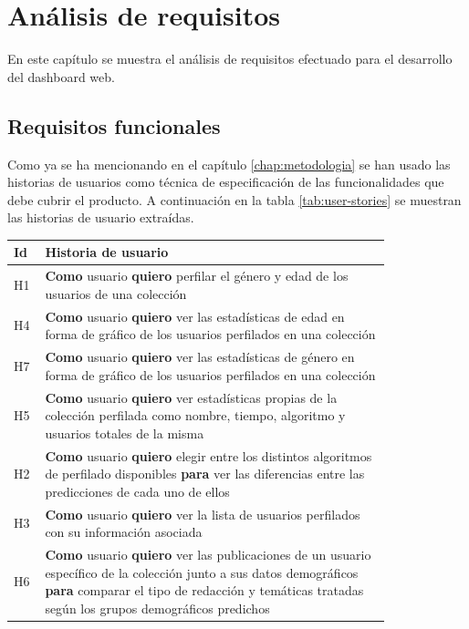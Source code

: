 \chapter{Análisis de requisitos}
\label{chap:analisis}
En este capítulo se muestra el análisis de requisitos efectuado para el desarrollo del dashboard web.

\section{Requisitos funcionales}
Como ya se ha mencionando en el capítulo \ref{chap:metodologia} se han usado las historias de usuarios como técnica de especificación de las funcionalidades que debe cubrir el producto. A continuación en la tabla \ref{tab:user-stories} se muestran las historias de usuario extraídas.
\begin{table}[H]
{
    \setlength\arrayrulewidth{0.75pt}
    \setlength{\tabcolsep}{0.9\tabcolsep}

    \begin{tabular}{|p{0.04\linewidth} | p{0.78\linewidth}|}
    \hline
    Id & Historia de usuario \\ \hline
    H1 & \textbf{Como} usuario \textbf{quiero} perfilar el género y edad de los usuarios de una colección \\ \hline
    H4 & \textbf{Como} usuario \textbf{quiero} ver las estadísticas de edad en forma de gráfico de los usuarios perfilados en una colección \\ \hline
    H7 & \textbf{Como} usuario \textbf{quiero} ver las estadísticas de género en forma de gráfico de los usuarios perfilados en una colección \\ \hline
    H5 & \textbf{Como} usuario \textbf{quiero} ver estadísticas propias de la colección perfilada como nombre, tiempo, algoritmo y usuarios totales de la misma \\ \hline
    H2 & \textbf{Como} usuario \textbf{quiero} elegir entre los distintos algoritmos de perfilado disponibles \textbf{para} ver las diferencias entre las predicciones de cada uno de ellos \\ \hline
    H3 & \textbf{Como} usuario \textbf{quiero} ver la lista de usuarios perfilados con su información asociada \\ \hline

    H6 & \textbf{Como} usuario \textbf{quiero} ver las publicaciones de un usuario específico de la colección junto a sus datos demográficos \textbf{para} comparar el tipo de redacción y temáticas tratadas según los grupos demográficos predichos \\ \hline


\end{tabular}}
\end{table}
